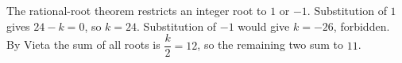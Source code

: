 The rational-root theorem restricts an integer root to $1$ or $-1$. Substitution of $1$ gives $24-k=0$, so $k=24$. Substitution of $-1$ would give $k=-26$, forbidden. By Vieta the sum of all roots is $\dfrac{k}{2}=12$, so the remaining two sum to $\boxed{11}$.
